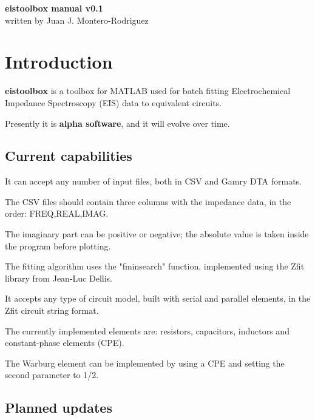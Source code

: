 \documentclass[10pt,a4paper,oneside]{book}
\begin{document}
\setlength{\parindent}{0pt}

\begin{titlepage}
	
	\textbf{eistoolbox manual v0.1}\\
	written by Juan J. Montero-Rodriguez
	
\end{titlepage}



\tableofcontents

\chapter{Introduction}

\textbf{eistoolbox} is a toolbox for MATLAB\textregistered{} used for batch fitting Electrochemical Impedance Spectroscopy (EIS) data to equivalent circuits. 

Presently it is \textbf{alpha software}, and it will evolve over time.

\section{Current capabilities}

It can accept any number of input files, both in CSV and Gamry DTA formats.

The CSV files should contain three columns with the impedance data, in the order: FREQ,REAL,IMAG. 

The imaginary part can be positive or negative; the absolute value is taken inside the program before plotting.

The fitting algorithm uses the "fminsearch" function, implemented using the Zfit library from Jean-Luc Dellis. 

It accepts any type of circuit model, built with serial and parallel elements, in the Zfit circuit string format.

The currently implemented elements are: resistors, capacitors, inductors and constant-phase elements (CPE). 

The Warburg element can be implemented by using a CPE and setting the second parameter to 1/2.





\section{Planned updates}
\end{document}
